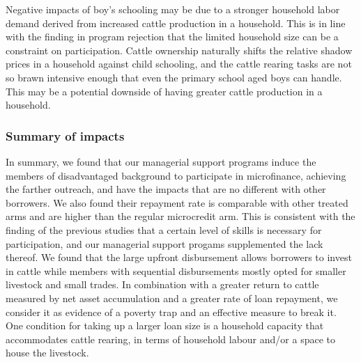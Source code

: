 	 Negative impacts of boy's schooling may be due to a stronger household labor demand derived from increased cattle production in a household. This is in line with the finding in program rejection that the limited household size can be a constraint on participation. Cattle ownership naturally shifts the relative shadow prices in a household against child schooling, and the cattle rearing tasks are not so brawn intensive enough that even the primary school aged boys can handle. This may be a potential downside of having greater cattle production in a household. 

\subsubsection{Summary of impacts}

	In summary, we found that our managerial support programs induce the members of disadvantaged background to participate in microfinance, achieving the farther outreach, and have the impacts that are no different with other borrowers. We also found their repayment rate is comparable with other treated arms and are higher than the regular microcredit arm. This is consistent with the finding of the previous studies that a certain level of skills is necessary for participation, and our managerial support progams supplemented the lack thereof. We found that the large upfront disbursement allows borrowers to invest in cattle while members with sequential disbursements mostly opted for smaller livestock and small trades. In combination with a greater return to cattle measured by net asset accumulation and a greater rate of loan repayment, we consider it as evidence of a poverty trap and an effective measure to break it. One condition for taking up a larger loan size is a household capacity that accommodates cattle rearing, in terms of household labour and/or a space to house the livestock. 


